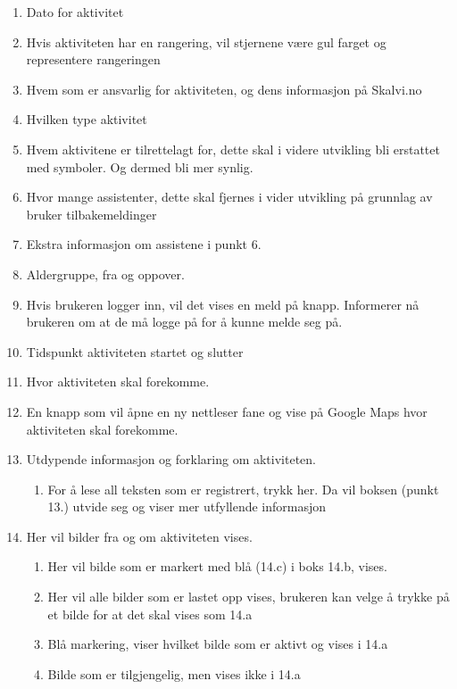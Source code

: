 \begin{enumerate}[nosep]
    \item Dato for aktivitet
    \item Hvis aktiviteten har en rangering, vil stjernene være gul farget og representere rangeringen
    \item Hvem som er ansvarlig for aktiviteten, og dens informasjon på Skalvi.no
    \item Hvilken type aktivitet
    \item Hvem aktivitene er tilrettelagt for, dette skal i videre utvikling bli erstattet med symboler. Og dermed bli mer synlig.
    \item Hvor mange assistenter, dette skal fjernes i vider utvikling på grunnlag av bruker tilbakemeldinger
    \item Ekstra informasjon om assistene i punkt 6. 
    \item Aldergruppe, fra og oppover.
    \item Hvis brukeren logger inn, vil det vises en meld på knapp. Informerer nå brukeren om at de må logge på for å kunne melde seg på.
    \item Tidspunkt aktiviteten startet og slutter
    \item Hvor aktiviteten skal forekomme.
    \item En knapp som vil åpne en ny nettleser fane og vise på Google Maps hvor aktiviteten skal forekomme.
    \item Utdypende informasjon og forklaring om aktiviteten. 
    \begin{enumerate}
        \item For å lese all teksten som er registrert, trykk her. Da vil boksen (punkt 13.) utvide seg og viser mer utfyllende informasjon
    \end{enumerate}
    \item Her vil bilder fra og om aktiviteten vises.
    \begin{enumerate}
        \item Her vil bilde som er markert med blå (14.c) i boks 14.b,  vises. 
        \item Her vil alle bilder som er lastet opp vises, brukeren kan velge å trykke på et bilde for at det skal vises som 14.a
        \item Blå markering, viser hvilket bilde som er aktivt og vises i 14.a
        \item Bilde som er tilgjengelig, men vises ikke i 14.a
    \end{enumerate}

\end{enumerate}
